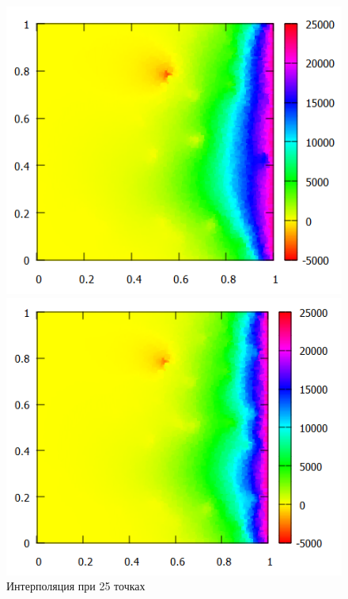 \documentclass[14pt, a4paper]{extarticle}
\begin{document}
\begin{enumerate}
\begin{figure}[H]
			\end{figure}
			\begin{figure}[H]
				\begin{minipage}{0.5\textwidth}
					\centering
					\includegraphics[width = \linewidth]{../4func/M=25T=5774Err=0.475457.png}
					\caption[.] {Интерполяция при 25 точках}
				\end{minipage}\hfill
				\begin{minipage}{0.5\textwidth}
					\centering
					\includegraphics[width = \linewidth]{../4func/M=50T=5774Err=0.273087.png}

\end{minipage}
\end{figure}
\end{enumerate}
\end{document}
